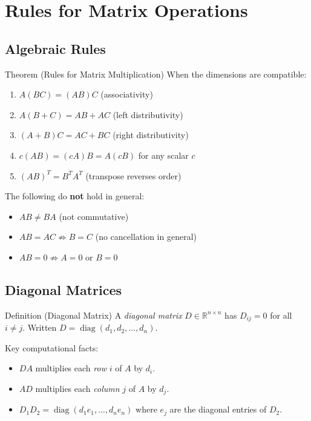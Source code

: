 
\section{Rules for Matrix Operations}

\subsection*{Algebraic Rules}

\begin{theorembox}{Theorem (Rules for Matrix Multiplication)}
When the dimensions are compatible:
\begin{enumerate}
  \item $A(BC) = (AB)C$ \hfill (associativity)
  \item $A(B + C) = AB + AC$ \hfill (left distributivity)
  \item $(A + B)C = AC + BC$ \hfill (right distributivity)
  \item $c(AB) = (cA)B = A(cB)$ for any scalar $c$
  \item $(AB)^T = B^T A^T$ \hfill (transpose reverses order)
\end{enumerate}
The following do \textbf{not} hold in general:
\begin{itemize}
  \item $AB \neq BA$ (not commutative)
  \item $AB = AC \not\Rightarrow B = C$ (no cancellation in general)
  \item $AB = 0 \not\Rightarrow A = 0$ or $B = 0$
\end{itemize}
\end{theorembox}

\subsection*{Diagonal Matrices}

\begin{propositionbox}{Definition (Diagonal Matrix)}
A \emph{diagonal matrix} $D \in \mathbb{R}^{n \times n}$ has $D_{ij} = 0$
for all $i \neq j$.
Written $D = \operatorname{diag}(d_1, d_2, \ldots, d_n)$.

Key computational facts:
\begin{itemize}
  \item $DA$ multiplies each \emph{row} $i$ of $A$ by $d_i$.
  \item $AD$ multiplies each \emph{column} $j$ of $A$ by $d_j$.
  \item $D_1 D_2 = \operatorname{diag}(d_1 e_1, \ldots, d_n e_n)$ where $e_j$ are the diagonal entries of $D_2$.
\end{itemize}
\end{propositionbox}


